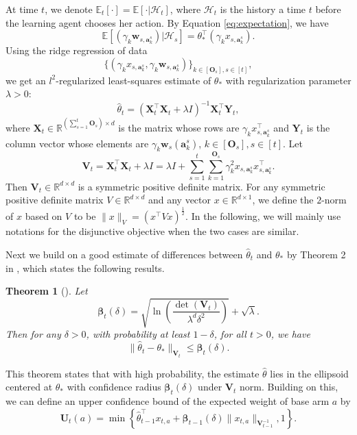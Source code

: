 \documentclass{article}
\newcommand{\bbeta}{\boldsymbol{\beta}}
\newcommand{\EE}{\mathbb{E}}
\newcommand{\RR}{\mathbb{R}}
\newcommand{\ba}{\mathbf{a}}
\newcommand{\bO}{\mathbf{O}}
\newcommand{\bU}{\mathbf{U}}
\newcommand{\bV}{\mathbf{V}}
\newcommand{\bw}{\mathbf{w}}
\newcommand{\bX}{\mathbf{X}}
\newcommand{\bY}{\mathbf{Y}}
\newcommand{\cH}{\mathcal{H}}
\newcommand{\norm}[1]{\| #1 \|}
\newtheorem{theorem}{Theorem}[section]
\begin{document}
At time $t$, we denote $\EE_t[\cdot] = \EE[\cdot | \cH_t]$, where $\cH_t$ is the history a time $t$ before the learning agent chooses her action. By Equation \eqref{eq:expectation}, we have 
$$
  \EE[(\gamma_k \bw_{s,\ba_k^s}) | \cH_{s}] = \theta_*^{\top} (\gamma_k x_{s,\ba_k^s}).
$$
Using the ridge regression of data 
$$
  \{(\gamma_k x_{s,\ba_k^s}, \gamma_k \bw_{s,\ba_k^s})\}_{k \in[\bO_s], s\in[t]},
$$
we get an $l^2$-regularized least-squares estimate of $\theta_*$ with regularization parameter $\lambda > 0$:
\begin{equation}
  \hat{\theta}_t = (\bX_t^{\top}\bX_t + \lambda I)^{-1} \bX_t^{\top} \bY_t,
\end{equation}
where $\bX_t \in \RR^{(\sum_{s=1}^{t}\bO_s) \times d}$ is the matrix whose rows are $\gamma_k x_{s,\ba_k^s}^{\top}$ and $\bY_t$ is the column vector whose elements are $\gamma_k \bw_s(\ba_k^s)$, $k \in[\bO_s], s\in[t]$. Let
$$
  \bV_t = \bX_t^{\top} \bX_t + \lambda I = \lambda I + \sum_{s=1}^{t} \sum_{k=1}^{\bO_s} \gamma_k^2 x_{s,\ba_k^s}x_{s,\ba_k^s}^{\top}.
$$
Then $\bV_t \in \RR^{d \times d}$ is a symmetric positive definite matrix. 
For any symmetric positive definite matrix $V \in \RR^{d \times d} $ and any vector $x \in \RR^{d \times 1}$, we define the $2$-norm of $x$ based on $V$ to be $\norm{x}_V = (x^{\top} V x)^{\frac{1}{2}}$.
In the following, we will mainly use notations for the disjunctive objective when the two cases are similar.

Next we build on a good estimate of differences between $\hat{\theta}_t$ and $\theta_*$ by Theorem 2 in \cite{abbasi2011improved}, which states the following results.
	
\begin{theorem}[\cite{abbasi2011improved}] %
  \label{thm:theta_estimate}
  Let 
  \begin{equation}
    \bbeta_{t}(\delta) = \sqrt{\ln\left(\frac{\det(\bV_{t})}{\lambda^d \delta^2}\right)} + \sqrt{\lambda}. \label{eq:definebeta}
  \end{equation}
  Then for any $\delta > 0$, with probability at least $1 - \delta$, for all $t > 0$, we have
  \begin{equation}
    \label{eq:estimateTheta}
    \norm{\hat{\theta}_t - \theta_{\ast}}_{\bV_{t}} \leq \bbeta_{t}(\delta).
  \end{equation}
\end{theorem}

This theorem states that with high probability, the estimate $\hat{\theta}$ lies in the ellipsoid centered at $\theta_*$ with confidence radius $\bbeta_t(\delta)$ under $\bV_t$ norm. 
Building on this, we can define an upper confidence bound of the expected weight of base arm $a$ by
\begin{equation}
  \label{eq:defU}
  \bU_t(a) = \min\left\{\hat{\theta}_{t-1}^{\top}x_{t,a} + \bbeta_{t-1}(\delta)\norm{x_{t,a}}_{\bV_{t-1}^{-1}}, 1 \right\}.
\end{equation}
\end{document}
